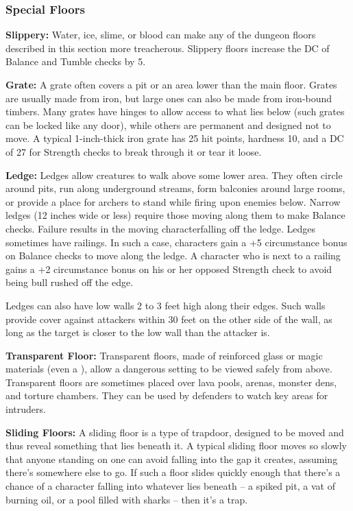 \subsubsection{Special Floors}

\textbf{Slippery:} Water, ice, slime, or blood can make any of the dungeon floors described in this section more treacherous. Slippery floors increase the DC of Balance and Tumble checks by 5. 

\textbf{Grate:} A grate often covers a pit or an area lower than the main floor. Grates are usually made from iron, but large ones can also be made from iron-bound timbers. Many grates have hinges to allow access to what lies below (such grates can be locked like any door), while others are permanent and designed not to move. A typical 1-inch-thick iron grate has 25 hit points, hardness 10, and a DC of 27 for Strength checks to break through it or tear it loose.

\textbf{Ledge:} Ledges allow creatures to walk above some lower area. They often circle around pits, run along underground streams, form balconies around large rooms, or provide a place for archers to stand while firing upon enemies below. Narrow ledges (12 inches wide or less) require those moving along them to make Balance checks. Failure results in the moving characterfalling off the ledge. Ledges sometimes have railings. In such a case, characters gain a +5 circumstance bonus on Balance checks to move along the ledge. A character who is next to a railing gains a +2 circumstance bonus on his or her opposed Strength check to avoid being bull rushed off the edge.

Ledges can also have low walls 2 to 3 feet high along their edges. Such walls provide cover against attackers within 30 feet on the other side of the wall, as long as the target is closer to the low wall than the attacker is.

\textbf{Transparent Floor:} Transparent floors, made of reinforced glass or magic materials (even a ), allow a dangerous setting to be viewed safely from above. Transparent floors are sometimes placed over lava pools, arenas, monster dens, and torture chambers. They can be used by defenders to watch key areas for intruders.

\textbf{Sliding Floors:} A sliding floor is a type of trapdoor, designed to be moved and thus reveal something that lies beneath it. A typical sliding floor moves so slowly that anyone standing on one can avoid falling into the gap it creates, assuming there's somewhere else to go. If such a floor slides quickly enough that there's a chance of a character falling into whatever lies beneath -- a spiked pit, a vat of burning oil, or a pool filled with sharks -- then it's a trap.


